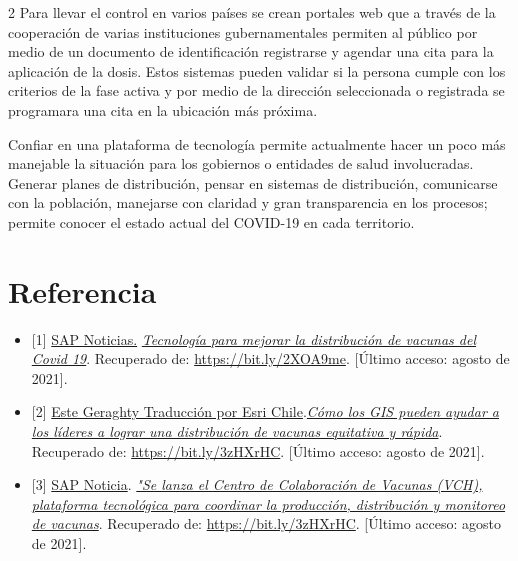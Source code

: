 \documentclass[12pt,spanish,Letterpaper,openany]{book}
\begin{document}
\begin {multicols}{2}
Para llevar el control en varios países se crean portales web que a través de la cooperación de
varias instituciones gubernamentales permiten al público por medio de un documento de
identificación registrarse y agendar una cita para la aplicación de la dosis. Estos sistemas
pueden validar si la persona cumple con los criterios de la fase activa y por medio de la
dirección seleccionada o registrada se programara una cita en la ubicación más próxima.

Confiar en una plataforma de tecnología permite actualmente hacer un poco más manejable la
situación para los gobiernos o entidades de salud involucradas. Generar planes de
distribución, pensar en sistemas de distribución, comunicarse con la población, manejarse con
claridad y gran transparencia en los procesos; permite conocer el estado actual del COVID-19
en cada territorio.

\hypertarget{referencia}{%
\section{Referencia}\label{referencia}}

\begin{itemize}
\item
  {[}1{]} \href{https://news.sap.com}{SAP Noticias.} \href{https://news.sap.com/latinamerica/2021/01/tecnologia-para-mejorar-la-distribucion-de-vacunas-del-covid-19/}{\emph{Tecnología para mejorar la distribución de vacunas del Covid 19}}.
  Recuperado de: \url{https://bit.ly/2XOA9me}. {[}Último acceso: agosto de 2021{]}.
\item
  {[}2{]} \href{https://www.esri.cl/}{Este Geraghty \textbar{} Traducción por Esri Chile}.\href{https://www.esri.cl/es-cl/noticias/distribucion-de-vacunas-contra-el-covid-19-con-gis}{\emph{Cómo los GIS pueden ayudar a los líderes a lograr una distribución de vacunas equitativa y rápida}}. Recuperado de: \url{https://bit.ly/3zHXrHC}. {[}Último acceso: agosto de 2021{]}.
\item
  {[}3{]} \href{https://www.whatsapp.com}{SAP Noticia}. \href{https://www.esri.cl/es-cl/noticias/distribucion-de-vacunas-contra-el-covid-19-con-gis}{\emph{"Se lanza el Centro de Colaboración de Vacunas (VCH), plataforma tecnológica para coordinar la producción, distribución y monitoreo de vacunas}}. Recuperado de: \url{https://bit.ly/3zHXrHC}. {[}Último acceso: agosto de 2021{]}.
\end{itemize}

\end {multicols}
\end{document}
